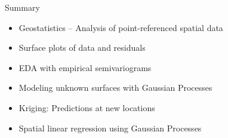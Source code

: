 \documentclass[xcolor=pdftex,dvipsnames,table,numbers,hyperref={pdfpagelabels=false},compress]{beamer}
\begin{document}

\begin{frame}{Summary}
\begin{itemize}
\item Geostatistics -- Analysis of point-referenced spatial data
\item Surface plots of data and residuals
\item EDA with empirical semivariograms
\item Modeling unknown surfaces with Gaussian Processes
\item Kriging: Predictions at new locations
\item Spatial linear regression using Gaussian Processes
\end{itemize}
\end{frame}
\end{document}
